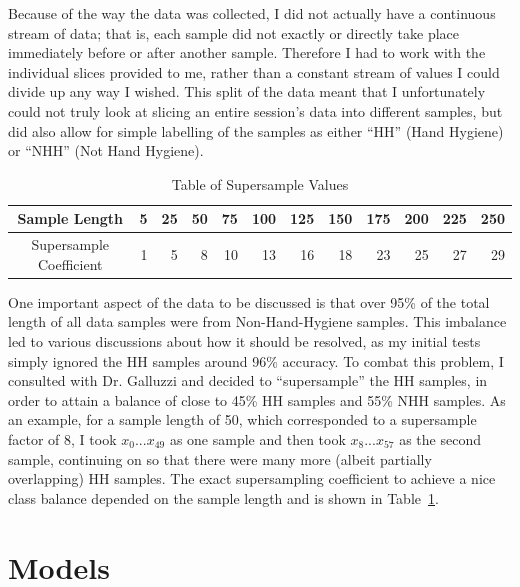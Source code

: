 \documentclass[]{report}
\begin{document}
Because of the way the data was collected, I did not actually have a continuous stream of data; that is, each sample did not exactly or directly take place immediately before or after another sample. Therefore I had to work with the individual slices provided to me, rather than a constant stream of values I could divide up any way I wished. This split of the data meant that I unfortunately could not truly look at slicing an entire session's data into different samples, but did also allow for simple labelling of the samples as either ``HH'' (Hand Hygiene) or ``NHH'' (Not Hand Hygiene).

\begin{table}
	\centering
	\label{supersamples}
	\begin{tabular}{|c|r|r|r|r|r|r|r|r|r|r|r|}
		\hline
		Sample Length          & 5 & 25 & 50 & 75 & 100 & 125 & 150 & 175 & 200 & 225 & 250 \\
		\hline
		Supersample Coefficient & 1 & 5  & 8  & 10 & 13 & 16  & 18  & 23  & 25  & 27  & 29 \\
		\hline
	\end{tabular}
	\caption{Table of Supersample Values}
\end{table}

One important aspect of the data to be discussed is that over 95\% of the total length of all data samples were from Non-Hand-Hygiene samples. This imbalance led to various discussions about how it should be resolved, as my initial tests simply ignored the HH samples around 96\% accuracy. To combat this problem, I consulted with Dr. Galluzzi and decided to ``supersample'' the HH samples, in order to attain a balance of close to 45\% HH samples and 55\% NHH samples. As an example, for a sample length of 50, which corresponded to a supersample factor of 8, I took $x_{0} ... x_{49}$ as one sample and then took $x_{8} ... x_{57}$ as the second sample, continuing on so that there were many more (albeit partially overlapping) HH samples. The exact supersampling coefficient to achieve a nice class balance depended on the sample length and is shown in Table~\ref{supersamples}.

\section{Models}\label{models}
\end{document}
